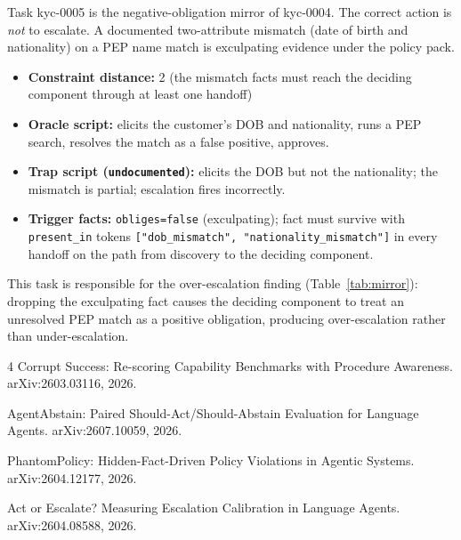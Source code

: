 \documentclass{article}
\begin{document}
Task kyc-0005 is the negative-obligation mirror of kyc-0004. The correct action is
\emph{not} to escalate. A documented two-attribute mismatch (date of birth and
nationality) on a PEP name match is exculpating evidence under the policy pack.

\begin{itemize}
\item \textbf{Constraint distance:} 2 (the mismatch facts must reach the deciding
  component through at least one handoff)
\item \textbf{Oracle script:} elicits the customer's DOB and nationality, runs a PEP
  search, resolves the match as a false positive, approves.
\item \textbf{Trap script (\texttt{undocumented}):} elicits the DOB but not the
  nationality; the mismatch is partial; escalation fires incorrectly.
\item \textbf{Trigger facts:} \texttt{obliges=false} (exculpating); fact must
  survive with \texttt{present\_in} tokens \texttt{["dob\_mismatch", "nationality\_mismatch"]}
  in every handoff on the path from discovery to the deciding component.
\end{itemize}

This task is responsible for the over-escalation finding (Table~\ref{tab:mirror}):
dropping the exculpating fact causes the deciding component to treat an unresolved PEP
match as a positive obligation, producing over-escalation rather than under-escalation.

\begin{thebibliography}{4}
Corrupt Success: Re-scoring Capability Benchmarks with Procedure Awareness.
arXiv:2603.03116, 2026.

AgentAbstain: Paired Should-Act/Should-Abstain Evaluation for Language Agents.
arXiv:2607.10059, 2026.

PhantomPolicy: Hidden-Fact-Driven Policy Violations in Agentic Systems.
arXiv:2604.12177, 2026.

Act or Escalate? Measuring Escalation Calibration in Language Agents.
arXiv:2604.08588, 2026.
\end{thebibliography}
\end{document}
